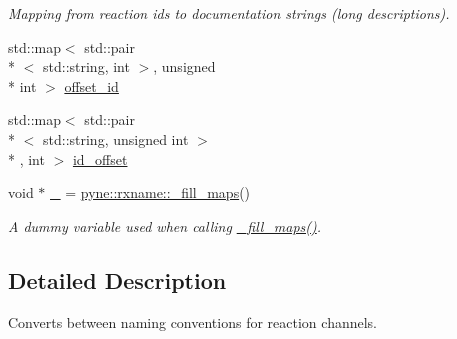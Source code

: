 \begin{DoxyCompactItemize}
\begin{DoxyCompactList}\small\item\em Mapping from reaction ids to documentation strings (long descriptions). \end{DoxyCompactList}\item 
std\+::map$<$ std\+::pair\\*
$<$ std\+::string, int $>$, unsigned \\*
int $>$ \hyperlink{namespacepyne_1_1rxname_a699be84310dad599582278e04135326e}{offset\+\_\+id}
\item 
std\+::map$<$ std\+::pair\\*
$<$ std\+::string, unsigned int $>$\\*
, int $>$ \hyperlink{namespacepyne_1_1rxname_ae2f5760c11dc39df3f90fbcc6584c95c}{id\+\_\+offset}
\item 
\hypertarget{namespacepyne_1_1rxname_ac59f8c4154e812420e0dfef0388a592b}{void $\ast$ \hyperlink{namespacepyne_1_1rxname_ac59f8c4154e812420e0dfef0388a592b}{\+\_\+} = \hyperlink{namespacepyne_1_1rxname_a4f97a2c91bfc51caf1e34eb21ed6c290}{pyne\+::rxname\+::\+\_\+fill\+\_\+maps}()}\label{namespacepyne_1_1rxname_ac59f8c4154e812420e0dfef0388a592b}

\begin{DoxyCompactList}\small\item\em A dummy variable used when calling \hyperlink{namespacepyne_1_1rxname_a4f97a2c91bfc51caf1e34eb21ed6c290}{\+\_\+fill\+\_\+maps()}. \end{DoxyCompactList}\end{DoxyCompactItemize}


\subsection{Detailed Description}
Converts between naming conventions for reaction channels. 

